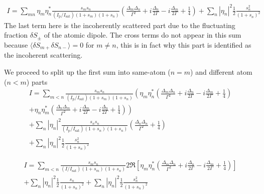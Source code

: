 \documentclass[11pt,letter]{article}
\newcommand{\iisat}{\ensuremath{I_{\mathrm{p}}/I_{\mathrm{sat}}}}
\begin{document}
\begin{multline}
 I  = 
  \sum_{mn}  \eta_{m}\eta_{n}^{*}
    \frac{ s_{m} s_{n} } { (\iisat) ( 1+s_{m} )( 1+s_{n} ) }
    \left(
        \frac{ \Delta_{m} \Delta_{n} }{ \Gamma^{2} } 
      + i \frac{ \Delta_{n} }{ 2 \Gamma } 
      - i \frac{ \Delta_{m} }{ 2 \Gamma } 
      + \frac{1}{4}  
    \right)  
   + \sum_{n} | \eta_{n}|^{2} \frac{1}{2} \frac{ s_{n}^{2} } { (1 + s _{n} )^{2} } 
\end{multline}
The last term here is the incoherently scattered part due to the fluctuating
fraction $\delta S_{\pm}$ of the atomic dipole.  The cross terms do not appear
in this sum because $\langle \delta S_{m+} \delta S_{n-}\rangle =0$ for $m\neq
n$,  this is in fact why this part is identified as the incoherent scattering. 

We proceed to split up the first sum into same-atom ($n=m$) and different atom
($n<m$) parts 
\begin{multline}
 I  = 
  \sum_{m<n} 
    \frac{ s_{m} s_{n} } { (\iisat) ( 1+s_{m} )( 1+s_{n} ) }
    \left(
        \eta_{m}\eta_{n}^{*}
    \left(
        \frac{ \Delta_{m} \Delta_{n} }{ \Gamma^{2} } 
      + i \frac{ \Delta_{n} }{ 2 \Gamma } 
      - i \frac{ \Delta_{m} }{ 2 \Gamma } 
      + \frac{1}{4}  
    \right)  \right. \\
   \left.  + 
        \eta_{n}\eta_{m}^{*}
    \left(
        \frac{ \Delta_{n} \Delta_{m} }{ \Gamma^{2} } 
      + i \frac{ \Delta_{m} }{ 2 \Gamma } 
      - i \frac{ \Delta_{n} }{ 2 \Gamma } 
      + \frac{1}{4}  
    \right) 
    \right)  \\
  + \sum_{n}  |\eta_{n}|^{2}
    \frac{ s_{n} s_{n} } { (\iisat) ( 1+s_{n} )( 1+s_{n} ) }
    \left(
        \frac{ \Delta_{n} \Delta_{n} }{ \Gamma^{2} } 
      + \frac{1}{4}  
    \right) \\ 
   + \sum_{n} | \eta_{n}|^{2} \frac{1}{2} \frac{ s_{n}^{2} } { (1 + s _{n} )^{2} } 
\end{multline}

\begin{multline}
 I  = 
  \sum_{m<n} 
    \frac{ s_{m} s_{n} } { (I/I_{\mathrm{sat}}) ( 1+s_{m} )( 1+s_{n} ) }
    2 \Re\left[ 
        \eta_{m}\eta_{n}^{*}
    \left(
        \frac{ \Delta_{m} \Delta_{n} }{ \Gamma^{2} } 
      + i \frac{ \Delta_{n} }{ 2 \Gamma } 
      - i \frac{ \Delta_{m} }{ 2 \Gamma } 
      + \frac{1}{4}  
    \right) \right] \\
  + \sum_{n}  |\eta_{n}|^{2}
    \frac{1}{2}	\frac{ s_{n} } { ( 1+s_{n} )^{2} }
   + \sum_{n} | \eta_{n}|^{2} \frac{1}{2} \frac{ s_{n}^{2} } { (1 + s _{n} )^{2} } 
\end{multline}
\end{document}
